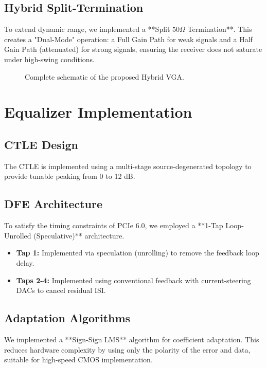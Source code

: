\subsection{Hybrid Split-Termination}
To extend dynamic range, we implemented a **Split $50\Omega$ Termination**. This creates a "Dual-Mode" operation: a Full Gain Path for weak signals and a Half Gain Path (attenuated) for strong signals, ensuring the receiver does not saturate under high-swing conditions.

\begin{figure}[htbp]
    \centering
    \setlength{\fboxsep}{0pt}
    \setlength{\fboxrule}{1pt}
    \caption{Complete schematic of the proposed Hybrid VGA.}
    \label{fig:vga_schematic}
\end{figure}

\section{Equalizer Implementation}
\subsection{CTLE Design}
The CTLE is implemented using a multi-stage source-degenerated topology to provide tunable peaking from 0 to 12 dB.

\subsection{DFE Architecture}
To satisfy the timing constraints of PCIe 6.0, we employed a **1-Tap Loop-Unrolled (Speculative)** architecture.
\begin{itemize}
    \item \textbf{Tap 1:} Implemented via speculation (unrolling) to remove the feedback loop delay.
    \item \textbf{Taps 2-4:} Implemented using conventional feedback with current-steering DACs to cancel residual ISI.
\end{itemize}

\subsection{Adaptation Algorithms}
We implemented a **Sign-Sign LMS** algorithm for coefficient adaptation. This reduces hardware complexity by using only the polarity of the error and data, suitable for high-speed CMOS implementation.